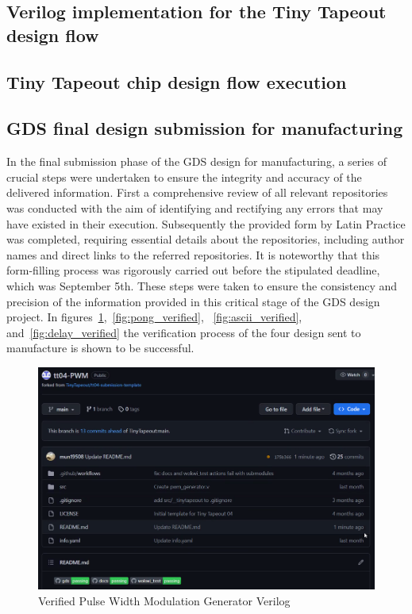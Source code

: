 \subsection{Verilog implementation for the Tiny Tapeout design flow}

\subsection{Tiny Tapeout chip design flow execution}

\subsection{GDS final design submission for manufacturing}

In the final submission phase of the GDS design for 
manufacturing, a series of crucial steps were undertaken to ensure the
integrity and accuracy of the delivered information. First a comprehensive 
review of all relevant repositories was conducted with the aim of identifying
and rectifying any errors that may have existed in their execution. Subsequently
the provided form by Latin Practice was completed, requiring essential 
details about the repositories, including author names and direct links 
to the referred repositories. It is noteworthy that this form-filling 
process was rigorously carried out before the stipulated deadline, which 
was September 5th. These steps were taken to ensure the consistency and 
precision of the information provided in this critical stage of the GDS 
design project. In figures\ \ref*{fig:pwm_verified},\ \ref*{fig:pong_verified},
\ \ref*{fig:ascii_verified}, and\ \ref*{fig:delay_verified} the verification 
process of the four design sent to manufacture is shown to be successful.

\begin{figure}[tbh]
    \centering
    \includegraphics[width=\linewidth]{Pictures/pwm_verified.png}
    \caption{Verified Pulse Width Modulation Generator Verilog }\label{fig:pwm_verified}
\end{figure}


